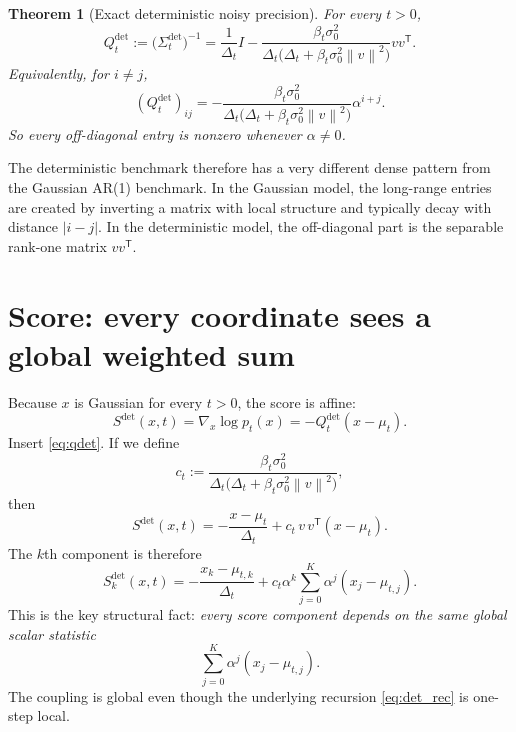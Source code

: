 \documentclass[11pt]{article}
\newtheorem{theorem}[proposition]{Theorem}
\newcommand{\Id}{I}
\newcommand{\trans}{\mathsf{T}}
\newcommand{\norm}[1]{\left\lVert #1 \right\rVert}
\newcommand{\abs}[1]{\left| #1 \right|}
\begin{document}
\begin{theorem}[Exact deterministic noisy precision]\label{thm:qdet}
For every $t>0$,
\begin{equation}\label{eq:qdet}
Q_t^{\mathrm{det}}
:=
\bigl(\Sigma_t^{\mathrm{det}}\bigr)^{-1}
=
\frac{1}{\Delta_t}\Id-
\frac{\beta_t\sigma_0^2}{\Delta_t\bigl(\Delta_t+\beta_t\sigma_0^2\norm{v}^2\bigr)}vv^\trans.
\end{equation}
Equivalently, for $i\ne j$,
\begin{equation}\label{eq:qdet_offdiag}
(Q_t^{\mathrm{det}})_{ij}
=
-
\frac{\beta_t\sigma_0^2}{\Delta_t\bigl(\Delta_t+\beta_t\sigma_0^2\norm{v}^2\bigr)}\alpha^{i+j}.
\end{equation}
So every off-diagonal entry is nonzero whenever $\alpha\ne 0$.
\end{theorem}

The deterministic benchmark therefore has a very different dense pattern from the Gaussian AR(1) benchmark. In the Gaussian model, the long-range entries are created by inverting a matrix with local structure and typically decay with distance $\abs{i-j}$. In the deterministic model, the off-diagonal part is the separable rank-one matrix $vv^\trans$.

\section{Score: every coordinate sees a global weighted sum}
Because $x$ is Gaussian for every $t>0$, the score is affine:
\begin{equation}\label{eq:score_det}
S^{\mathrm{det}}(x,t)=\nabla_x\log p_t(x)=-Q_t^{\mathrm{det}}(x-\mu_t).
\end{equation}
Insert \eqref{eq:qdet}. If we define
\begin{equation}\label{eq:ct_def}
 c_t:=\frac{\beta_t\sigma_0^2}{\Delta_t\bigl(\Delta_t+\beta_t\sigma_0^2\norm{v}^2\bigr)},
\end{equation}
then
\begin{equation}\label{eq:score_det_expand}
S^{\mathrm{det}}(x,t)
=
-
\frac{x-\mu_t}{\Delta_t}
+
 c_t\,v\,v^\trans(x-\mu_t).
\end{equation}
The $k$th component is therefore
\begin{equation}\label{eq:score_det_component}
S_k^{\mathrm{det}}(x,t)
=
-
\frac{x_k-\mu_{t,k}}{\Delta_t}
+
 c_t\alpha^k\sum_{j=0}^{K}\alpha^j(x_j-\mu_{t,j}).
\end{equation}
This is the key structural fact: \emph{every score component depends on the same global scalar statistic}
\[
\sum_{j=0}^{K}\alpha^j(x_j-\mu_{t,j}).
\]
The coupling is global even though the underlying recursion \eqref{eq:det_rec} is one-step local.
\end{document}
